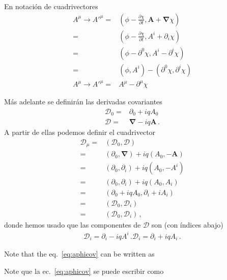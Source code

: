 En notación de cuadrivectores
\begin{align}
  A^\mu\to {A'}^\mu=&\left(\phi-\frac{\partial\chi}{\partial t},\mathbf{A}+\boldsymbol{\nabla}\chi
  \right)\nonumber\\
  =&\left(\phi-\frac{\partial\chi}{\partial t},A^{i}+\partial_i\chi
  \right)\nonumber\\
  =&\left(\phi-\partial^0\chi,A^{i}-\partial^{i}\chi
  \right)\nonumber\\
  =&\left(\phi,A^{i}
  \right)-
  \left(
    \partial^0\chi,\partial^{i}\chi
  \right)\nonumber\\
  \label{eq:aphicov}
  A^\mu\to {A'}^\mu=&A^\mu-\partial^\mu\chi
\end{align}




Más adelante se definirán las derivadas  covariantes
\begin{align}
   \mathcal{D}_0=&\partial_0+i q A_0\nonumber\\
  \boldsymbol{\mathcal{D}}=&\boldsymbol{\nabla}-i q \mathbf{A}\,.
\end{align}
A partir de ellas podemos definir el cuadrivector
\begin{align}
  \mathcal{D}_\mu=&(\mathcal{D}_0,\boldsymbol{\mathcal{D}})\nonumber\\
=&(\partial_0,\boldsymbol{\nabla})+i q(A_0,-\mathbf{A})\nonumber\\
=&(\partial_0,\partial_i)+i q(A_0,-A^i)\nonumber\\
=&(\partial_0,\partial_i)+i q(A_0,A_i)\nonumber\\
=&(\partial_0+i q A_0,\partial_i+i A_i)\nonumber\\
=&(\mathcal{D}_0,\mathcal{D}_i)\nonumber\\
=&(\mathcal{D}_0,\mathcal{D}_i)\,,
\end{align}
donde hemos usado que las componentes de $\mathcal{D}$ son (con índices abajo)
\begin{align}
\mathcal{D}_i=\partial_i-i q A^i\,.
  \mathcal{D}_i=\partial_i+i q A_i\,.
\end{align}

\begin{english}
Note that the eq.~\eqref{eq:aphicov} can be written as  
\end{english}
\begin{spanish}
Note que la ec.~\eqref{eq:aphicov} se puede escribir como
\end{spanish}

